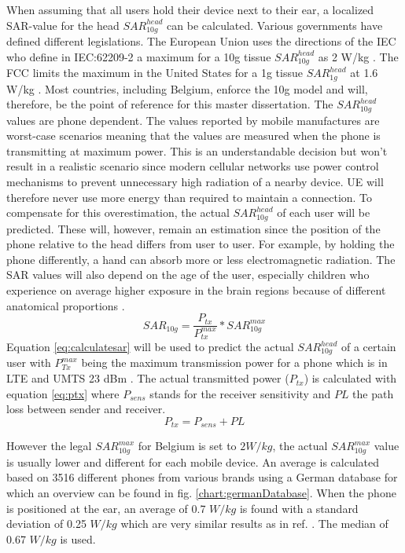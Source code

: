 When assuming that all users hold their device next to their ear, a localized SAR-value for the head $SAR^{head}_{10g}$ can be calculated.
Various governments have defined different legislations.
The European Union uses the directions of the  \acs{IEC} who
 define in IEC:62209-2 a maximum for a 10g tissue $SAR^{head}_{10g}$ as 2 W/kg \cite{J23}.
The \acs{FCC} limits the maximum in the United States for a 1g tissue $SAR^{head}_{1g}$ at 1.6 W/kg \cite{S15_SARFCC}.
Most countries, including Belgium, enforce the 10g model and will, therefore, be the point of reference for this master dissertation.
The $SAR^{head}_{10g}$ values are phone dependent. The values reported by mobile manufactures are worst-case scenarios meaning that the 
values are measured when the phone is transmitting at maximum power. This is an understandable decision but won't result in a realistic scenario since 
modern cellular networks use power control mechanisms to prevent unnecessary high radiation of a nearby device. \gls{UE} will therefore never use more energy than 
required to maintain a connection.
To compensate for this overestimation, the actual $SAR^{head}_{10g}$ of each user will be predicted. These will, however, remain an estimation since the 
position of the phone relative to the head differs from user to user. For example, by holding the phone differently, a hand can absorb more or less 
electromagnetic radiation. The \gls{SAR} values will also depend on the age of the user, especially children who experience on average higher exposure in 
the brain regions because of different anatomical proportions \cite{J26_SARtissueage, J10_RDP}.
\begin{equation}
{SAR}_{10g} = \frac{P_{tx}}{P^{max}_{tx}} * {SAR}^{max}_{10g}
\label{eq:calculatesar}
\end{equation}
Equation \ref{eq:calculatesar} will be used to predict the actual $SAR^{head}_{10g}$  of a certain user with 
$P^{max}_{Tx}$ being the maximum transmission power for a phone which is in \gls{LTE} and UMTS 23 dBm \cite{J11_maxTpxUE, J10_RDP}.
The actual transmitted power ($P_{tx}$) is calculated with equation \ref{eq:ptx} where $P_{sens}$
stands for the receiver sensitivity and $PL$ the path loss between sender and receiver.
\begin{equation}
P_{tx} = P_{sens} + PL
\label{eq:ptx}
\end{equation}
 
However the legal $SAR^{max}_{10g}$ for Belgium is set to $2 W/kg$,  the actual  $SAR^{max}_{10g}$ value is usually lower and different for each mobile device. 
An average is calculated based on 3516 different phones from various brands using a German database \cite{SARDatabase} for which an overview can be 
found in fig. \ref{chart:germanDatabase}.
When the phone is positioned at the ear, an average of 0.7 $W/kg$ is found with a standard deviation of 0.25 $W/kg$ which are very similar 
results as in ref. \cite{j10.1.1}. The median of 0.67  $W/kg$ is used.

